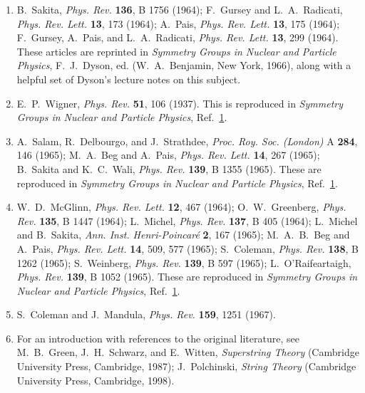 \begin{enumerate}
  \item {}\label{ch24-ref-1}
  B.~Sakita, \textit{Phys. Rev.} \textbf{136}, B 1756 (1964);
  F.~Gursey and L.~A.~Radicati, \textit{Phys. Rev. Lett.} \textbf{13},
  173 (1964); A.~Pais, \textit{Phys. Rev. Lett.} \textbf{13}, 175
  (1964); F.~Gursey, A.~Pais, and L.~A.~Radicati,
  \textit{Phys. Rev. Lett.} \textbf{13}, 299 (1964). These articles are
  reprinted in \textit{Symmetry Groups in Nuclear and Particle Physics},
  F.~J.~Dyson, ed. (W.~A.~Benjamin, New York, 1966), along with a helpful
  set of Dyson's lecture notes on this subject.

  \item {}\label{ch24-ref-2}
  E.~P.~Wigner, \textit{Phys. Rev.} \textbf{51}, 106 (1937). This is
  reproduced in \textit{Symmetry Groups in Nuclear and Particle Physics},
  Ref.~\hyperref[ch24-ref-1]{1}.

  \item {}\label{ch24-ref-3}
  A.~Salam, R.~Delbourgo, and J.~Strathdee,
  \textit{Proc. Roy. Soc. (London)} A \textbf{284}, 146 (1965);
  M.~A.~Beg and A.~Pais, \textit{Phys. Rev. Lett.} \textbf{14}, 267
  (1965); B.~Sakita and K.~C.~Wali, \textit{Phys. Rev.} \textbf{139},
  B 1355 (1965). These are reproduced in
  \textit{Symmetry Groups in Nuclear and Particle Physics},
  Ref.~\hyperref[ch24-ref-1]{1}.

  \item {}\label{ch24-ref-4}
  W.~D.~McGlinn, \textit{Phys. Rev. Lett.} \textbf{12}, 467 (1964);
  O.~W.~Greenberg, \textit{Phys. Rev.} \textbf{135}, B 1447 (1964);
  L.~Michel, \textit{Phys. Rev.} \textbf{137}, B 405 (1964);
  L.~Michel and B.~Sakita, \textit{Ann. Inst. Henri-Poincar\'e}
  \textbf{2}, 167 (1965); M.~A.~B.~Beg and A.~Pais,
  \textit{Phys. Rev. Lett.} \textbf{14}, 509, 577 (1965);
  S.~Coleman, \textit{Phys. Rev.} \textbf{138}, B 1262 (1965);
  S.~Weinberg, \textit{Phys. Rev.} \textbf{139}, B 597 (1965);
  L.~O'Raifeartaigh, \textit{Phys. Rev.} \textbf{139}, B 1052 (1965).
  These are reproduced in
  \textit{Symmetry Groups in Nuclear and Particle Physics},
  Ref.~\hyperref[ch24-ref-1]{1}.

  \item {}\label{ch24-ref-5}
  S.~Coleman and J.~Mandula, \textit{Phys. Rev.} \textbf{159}, 1251
  (1967).

  \item {}\label{ch24-ref-6}
  For an introduction with references to the original literature, see
  M.~B.~Green, J.~H.~Schwarz, and E.~Witten,
  \textit{Superstring Theory} (Cambridge University Press, Cambridge,
  1987); J.~Polchinski, \textit{String Theory} (Cambridge University
  Press, Cambridge, 1998).


\end{enumerate}
